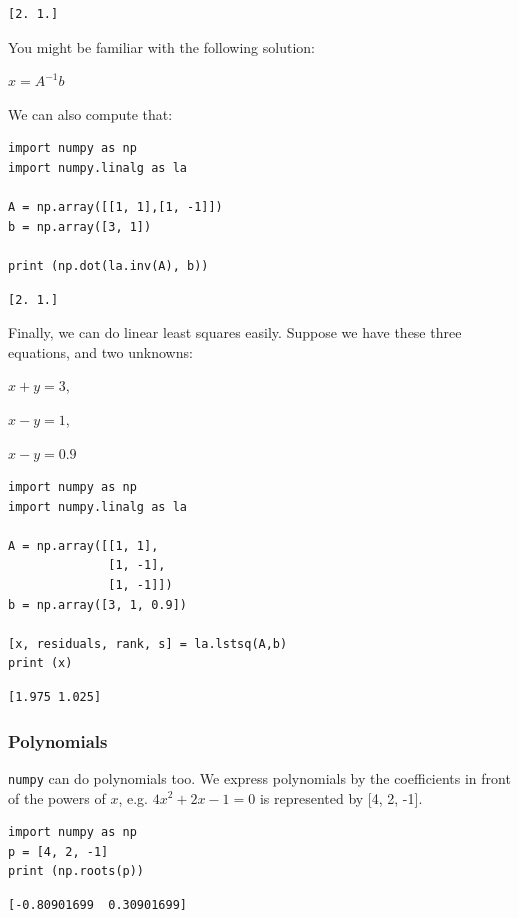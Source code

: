 \documentclass[11pt]{article}
\begin{document}
\begin{verbatim}
[2. 1.]
\end{verbatim}

You might be familiar with the following solution:

\(x = A^{-1} b\)

We can also compute that:

\begin{verbatim}
import numpy as np
import numpy.linalg as la

A = np.array([[1, 1],[1, -1]])
b = np.array([3, 1])

print (np.dot(la.inv(A), b))
\end{verbatim}

\begin{verbatim}
[2. 1.]
\end{verbatim}

Finally, we can do linear least squares easily. Suppose we have these three equations, and two unknowns:

\(x + y = 3\),

\(x - y = 1\),

\(x - y = 0.9\)

\begin{verbatim}
import numpy as np
import numpy.linalg as la

A = np.array([[1, 1],
              [1, -1],
              [1, -1]])
b = np.array([3, 1, 0.9])

[x, residuals, rank, s] = la.lstsq(A,b)
print (x)
\end{verbatim}

\begin{verbatim}
[1.975 1.025]
\end{verbatim}


\subsubsection{Polynomials}
\label{sec:orgd22115f}
\texttt{numpy} can do polynomials too. We express polynomials by the coefficients in front of the powers of \(x\), e.g. \(4 x^2 + 2x - 1 = 0\) is represented by [4, 2, -1].

\begin{verbatim}
import numpy as np
p = [4, 2, -1]
print (np.roots(p))
\end{verbatim}

\begin{verbatim}
[-0.80901699  0.30901699]
\end{verbatim}
\end{document}
